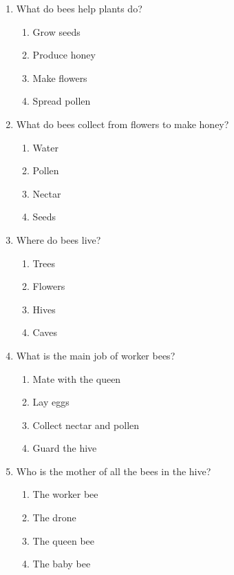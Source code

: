 \documentclass[12pt]{article}
\begin{document}
\begin{enumerate}

    \item What do bees help plants do?  
    \begin{enumerate}[label=\Alph*.]
        \item Grow seeds  
        \item Produce honey  
        \item Make flowers  
        \item Spread pollen
    \end{enumerate}
    \vspace{0.5cm}

    \item What do bees collect from flowers to make honey?  
    \begin{enumerate}[label=\Alph*.]
        \item Water  
        \item Pollen  
        \item Nectar  
        \item Seeds
    \end{enumerate}
    \vspace{0.5cm}

    \item Where do bees live?  
    \begin{enumerate}[label=\Alph*.]
        \item Trees  
        \item Flowers  
        \item Hives  
        \item Caves
    \end{enumerate}
    \vspace{0.5cm}

    \item What is the main job of worker bees?  
    \begin{enumerate}[label=\Alph*.]
        \item Mate with the queen  
        \item Lay eggs  
        \item Collect nectar and pollen  
        \item Guard the hive
    \end{enumerate}
    \vspace{0.5cm}

    \item Who is the mother of all the bees in the hive?  
    \begin{enumerate}[label=\Alph*.]
        \item The worker bee  
        \item The drone  
        \item The queen bee  
        \item The baby bee
    \end{enumerate}
    \vspace{0.5cm}


\end{enumerate}
\end{document}
